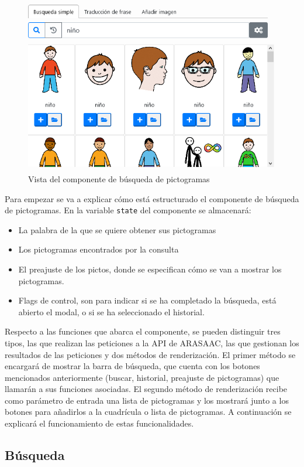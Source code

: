 \begin{figure}[h!]
	\centering
	\includegraphics[width=0.7\linewidth]{Imagenes/Bitmap/buscarPicto2}
	\caption{Vista del componente de búsqueda de pictogramas}
	\label{fig:buscarpicto2}
\end{figure}


Para empezar se va a explicar cómo está estructurado el componente de búsqueda de pictogramas. En la variable \texttt{state} del componente se almacenará:

\begin{itemize}
	\item La palabra de la que se quiere obtener sus pictogramas
	\item Los pictogramas encontrados por la consulta
	\item El preajuste de los pictos, donde se especifican cómo se van a mostrar los pictogramas.
	\item Flags de control, son para indicar si se ha completado la búsqueda, está abierto el modal, o si se ha seleccionado el historial.     
\end{itemize}

Respecto a las funciones que abarca el componente, se pueden distinguir tres tipos, las que realizan las peticiones a la API de ARASAAC, las que gestionan los resultados de las peticiones y dos métodos de renderización. El primer método se encargará de mostrar la barra de búsqueda, que cuenta con los botones mencionados anteriormente (buscar, historial, preajuste de pictogramas) que llamarán a sus funciones asociadas. El segundo método de renderización recibe como parámetro de entrada una lista de pictogramas y los mostrará junto a los botones para añadirlos a la cuadrícula o lista de pictogramas. A continuación se explicará el funcionamiento de estas funcionalidades. 


\subsection{Búsqueda}

